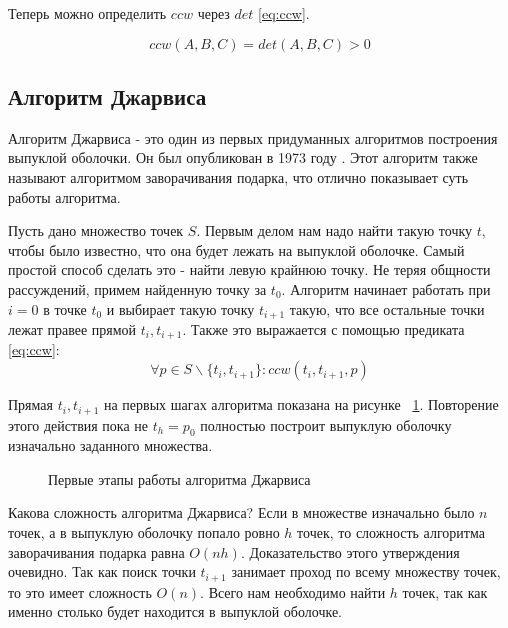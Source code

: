 Теперь можно определить $ccw$ через $det$ \eqref{eq:ccw}.

\begin{equation}\label{eq:ccw}
ccw(A, B, C)=det(A, B, C) > 0
\end{equation}


\subsection{Алгоритм Джарвиса} \label{subsect1_1_1}

Алгоритм Джарвиса - это один из первых придуманных алгоритмов построения выпуклой оболочки. Он был опубликован в 1973 году \cite{jarvis1973Jarvis}. Этот алгоритм также называют алгоритмом заворачивания подарка, что отлично показывает суть работы алгоритма.

Пусть дано множество точек $S$. Первым делом нам надо найти такую точку $t$, чтобы было известно, что она будет лежать на выпуклой оболочке. Самый простой способ сделать это - найти левую крайнюю точку. Не теряя общности рассуждений, примем найденную точку за $t_0$. Алгоритм начинает работать при $i=0$ в точке $t_0$ и выбирает такую точку $t_{i+1}$ такую, что все остальные точки лежат правее прямой $t_i, t_{i+1}$. Также это выражается с помощью предиката \eqref{eq:ccw}:
\[
\forall p \in S \backslash \{t_i, t_{i+1}\} : ccw(t_i, t_{i+1}, p)
\]

Прямая $t_i, t_{i+1}$ на первых шагах алгоритма показана на рисунке ~\ref{img:jarvis}. Повторение этого действия пока не $t_h=p_0$ полностью построит выпуклую оболочку изначально заданного множества.

\begin{figure}[H]
    {\centering
        \hfill
        \subbottom[\label{img:jarvis_1}]{%
            }
        \hfill
        \subbottom[\label{img:jarvis_2}]{%
            }
        \hfill
    }
    \caption{Первые этапы работы алгоритма Джарвиса}
    \label{img:jarvis}
\end{figure}

Какова сложность алгоритма Джарвиса? Если в множестве изначально было $n$ точек, а в выпуклую оболочку попало ровно $h$ точек, то сложность алгоритма заворачивания подарка равна $O(nh)$. Доказательство этого утверждения очевидно. Так как поиск точки $t_{i+1}$ занимает проход по всему множеству точек, то это имеет сложность $O(n)$. Всего нам необходимо найти $h$ точек, так как именно столько будет находится в выпуклой оболочке.

